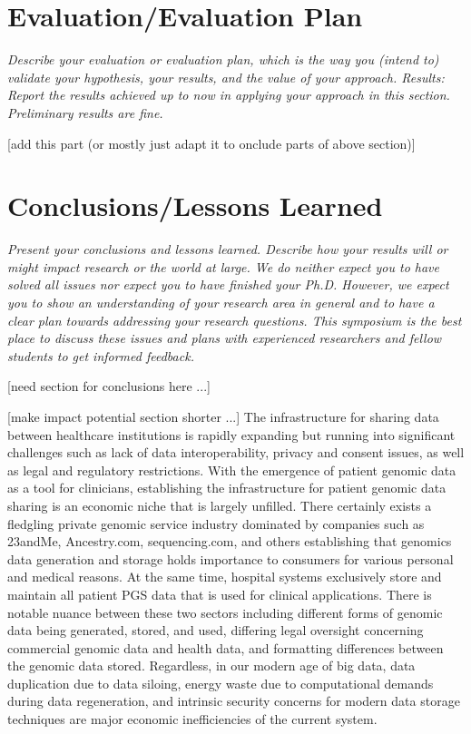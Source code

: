 \documentclass{article}
\begin{document}
\section{Evaluation/Evaluation Plan}
\textit{Describe your evaluation or evaluation plan, which is the way you (intend to) validate your hypothesis, your results, and the value of your approach.
Results: Report the results achieved up to now in applying your approach in this section. Preliminary results are fine.}


[add this part (or mostly just adapt it to onclude parts of above section)]



\section{Conclusions/Lessons Learned}
\textit{Present your conclusions and lessons learned. Describe how your results will or might impact research or the world at large. We do neither expect you to have solved all issues nor expect you to have finished your Ph.D. However, we expect you to show an understanding of your research area in general and to have a clear plan towards addressing your research questions. This symposium is the best place to discuss these issues and plans with experienced researchers and fellow students to get informed feedback.}

[need section for conclusions here ...]


[make impact potential section shorter ...]
The infrastructure for sharing data between healthcare institutions is rapidly expanding but running into significant challenges such as lack of data interoperability, privacy and consent issues, as well as legal and regulatory restrictions. With the emergence of patient genomic data as a tool for clinicians, establishing the infrastructure for patient genomic data sharing is an economic niche that is largely unfilled. There certainly exists a fledgling private genomic service industry dominated by companies such as 23andMe, Ancestry.com, sequencing.com, and others establishing that genomics data generation and storage holds importance to consumers for various personal and medical reasons. At the same time, hospital systems exclusively store and maintain all patient PGS data that is used for clinical applications. There is notable nuance between these two sectors including different forms of genomic data being generated, stored, and used, differing legal oversight concerning commercial genomic data and health data, and formatting differences between the genomic data stored. Regardless, in our modern age of big data, data duplication due to data siloing, energy waste due to computational demands during data regeneration, and intrinsic security concerns for modern data storage techniques are major economic inefficiencies of the current system. 
\end{document}
